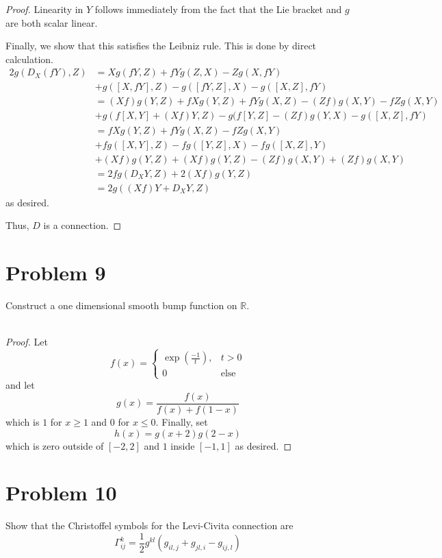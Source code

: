 \documentclass[fontsize=11pt]{scrartcl} %
\numberwithin{equation}{section} %
\numberwithin{figure}{section} %
\numberwithin{table}{section} %
\newcommand{\R}{\mathbb{R}}
\begin{document}
\begin{proof}
    Linearity in $Y$ follows immediately from the fact that the Lie bracket and
    $g$ are both scalar linear.

    Finally, we show that this satisfies the Leibniz rule. This is done by
    direct calculation.
    \[
        \begin{aligned}
            2g(D_X(fY),Z) &= Xg(fY,Z) + fYg(Z,X) - Zg(X,fY)\\
            &+ g([X,fY],Z) - g([fY,Z],X) - g([X,Z],fY)\\
            &= (Xf)g(Y,Z) + fXg(Y,Z) + fYg(X,Z) - (Zf)g(X,Y)-fZg(X,Y)\\
            &+g(f[X,Y] +(Xf)Y,Z) - g(f[Y,Z] -(Zf)g(Y,X) - g([X,Z],fY)\\
            &= fXg(Y,Z) + fYg(X,Z) - fZg(X,Y)\\
            &+ fg([X,Y],Z) -fg([Y,Z],X) - fg([X,Z],Y)\\
            &+(Xf)g(Y,Z) + (Xf)g(Y,Z) - (Zf)g(X,Y) + (Zf)g(X,Y)\\
            &= 2fg(D_XY,Z) + 2(Xf)g(Y,Z)\\
            &= 2g((Xf)Y + D_XY,Z)
        \end{aligned}
    \]
    as desired.

    Thus, $D$ is a connection.
\end{proof}

\section*{Problem 9}
Construct a one dimensional smooth bump function on $\R$.
\\
\\
\begin{proof}
    Let
    \[
        f(x) =
        \begin{cases}
            \exp(\frac{-1}{t}), &t>0\\
            0 &\text{else}
        \end{cases}
    \]
    and let
    \[
        g(x) = \frac{f(x)}{f(x) + f(1-x)}
    \]
    which is $1$ for $x\geq 1$ and $0$ for $x\leq 0$. Finally, set
\[
    h(x) = g(x+2)g(2-x)
\]
which is zero outside of $[-2,2]$ and $1$ inside $[-1,1]$ as desired.
\end{proof}

\section*{Problem 10}
Show that the Christoffel symbols for the Levi-Civita connection are
\[
    \Gamma_{ij}^k = \frac{1}{2}g^{kl}\left( g_{il,j}+g_{jl,i}-g_{ij,l} \right)
\]
\end{document}
